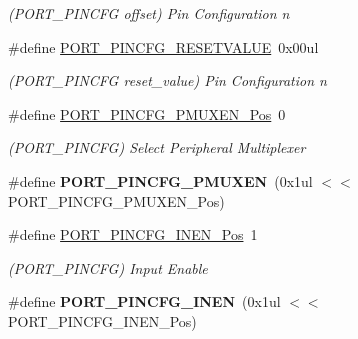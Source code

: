 \begin{DoxyCompactItemize}
\begin{DoxyCompactList}\small\item\em (P\+O\+R\+T\+\_\+\+P\+I\+N\+C\+F\+G offset) Pin Configuration n \end{DoxyCompactList}\item 
\hypertarget{group___s_a_m_l21___p_o_r_t_ga4e8b3dae5451509a2d436e492ecc4f52}{}\#define \hyperlink{group___s_a_m_l21___p_o_r_t_ga4e8b3dae5451509a2d436e492ecc4f52}{P\+O\+R\+T\+\_\+\+P\+I\+N\+C\+F\+G\+\_\+\+R\+E\+S\+E\+T\+V\+A\+L\+U\+E}~0x00ul\label{group___s_a_m_l21___p_o_r_t_ga4e8b3dae5451509a2d436e492ecc4f52}

\begin{DoxyCompactList}\small\item\em (P\+O\+R\+T\+\_\+\+P\+I\+N\+C\+F\+G reset\+\_\+value) Pin Configuration n \end{DoxyCompactList}\item 
\hypertarget{group___s_a_m_l21___p_o_r_t_ga1b62eff2451a3e0cfe61e19024900c17}{}\#define \hyperlink{group___s_a_m_l21___p_o_r_t_ga1b62eff2451a3e0cfe61e19024900c17}{P\+O\+R\+T\+\_\+\+P\+I\+N\+C\+F\+G\+\_\+\+P\+M\+U\+X\+E\+N\+\_\+\+Pos}~0\label{group___s_a_m_l21___p_o_r_t_ga1b62eff2451a3e0cfe61e19024900c17}

\begin{DoxyCompactList}\small\item\em (P\+O\+R\+T\+\_\+\+P\+I\+N\+C\+F\+G) Select Peripheral Multiplexer \end{DoxyCompactList}\item 
\hypertarget{group___s_a_m_l21___p_o_r_t_ga312407fd71d21257ff3770fe06a2b243}{}\#define {\bfseries P\+O\+R\+T\+\_\+\+P\+I\+N\+C\+F\+G\+\_\+\+P\+M\+U\+X\+E\+N}~(0x1ul $<$$<$ P\+O\+R\+T\+\_\+\+P\+I\+N\+C\+F\+G\+\_\+\+P\+M\+U\+X\+E\+N\+\_\+\+Pos)\label{group___s_a_m_l21___p_o_r_t_ga312407fd71d21257ff3770fe06a2b243}

\item 
\hypertarget{group___s_a_m_l21___p_o_r_t_ga485a99f4d0377f2ab8f26a2f79ef6604}{}\#define \hyperlink{group___s_a_m_l21___p_o_r_t_ga485a99f4d0377f2ab8f26a2f79ef6604}{P\+O\+R\+T\+\_\+\+P\+I\+N\+C\+F\+G\+\_\+\+I\+N\+E\+N\+\_\+\+Pos}~1\label{group___s_a_m_l21___p_o_r_t_ga485a99f4d0377f2ab8f26a2f79ef6604}

\begin{DoxyCompactList}\small\item\em (P\+O\+R\+T\+\_\+\+P\+I\+N\+C\+F\+G) Input Enable \end{DoxyCompactList}\item 
\hypertarget{group___s_a_m_l21___p_o_r_t_gaee13569a0c6188a200494aa3ea1997a6}{}\#define {\bfseries P\+O\+R\+T\+\_\+\+P\+I\+N\+C\+F\+G\+\_\+\+I\+N\+E\+N}~(0x1ul $<$$<$ P\+O\+R\+T\+\_\+\+P\+I\+N\+C\+F\+G\+\_\+\+I\+N\+E\+N\+\_\+\+Pos)\label{group___s_a_m_l21___p_o_r_t_gaee13569a0c6188a200494aa3ea1997a6}


\end{DoxyCompactItemize}
